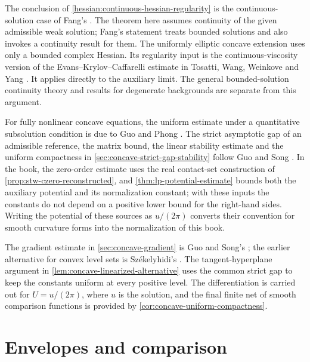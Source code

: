 The conclusion of \cref{hessian:continuous-hessian-regularity} is the
continuous-solution case of Fang's
\cite[v1, Theorem~4.1, pp.~17--18]{FangHessianSmooth26}.
The theorem here assumes continuity of the given admissible weak solution;
Fang's statement treats bounded solutions and also invokes a continuity
result for them. The uniformly elliptic concave extension uses only a
bounded complex Hessian. Its regularity input is the continuous-viscosity
version of the Evans--Krylov--Caffarelli estimate in Tosatti, Wang,
Weinkove and Yang
\cite[Theorem~3.4 and the paragraph following it, pp.~444--445]{TWWY15}.
It applies directly to the auxiliary limit. The general bounded-solution
continuity theory and results for degenerate backgrounds are separate
from this argument.

For fully nonlinear concave equations, the uniform estimate under a quantitative subsolution condition is due to Guo and Phong \cite[v1, Theorem~3.1 and its proof, pp.~8--11]{GP24}. The strict asymptotic gap of an admissible reference, the matrix bound, the linear stability estimate and the uniform compactness in \cref{sec:concave-strict-gap-stability} follow Guo and Song \cite[v1, Lemma~2.1, Proposition~2.8 and Lemma~2.9, pp.~4--11]{GS26}. In the book, the zero-order estimate uses the real contact-set construction of \cref{prop:stw-czero-reconstructed}, and \cref{thm:lp-potential-estimate} bounds both the auxiliary potential and its normalization constant; with these inputs the constants do not depend on a positive lower bound for the right-hand sides. Writing the potential of these sources as $u/(2\pi)$ converts their convention for smooth curvature forms into the normalization of this book.

The gradient estimate in \cref{sec:concave-gradient} is Guo and Song's \cite[v1, Theorem~1.1 and Proposition~3.1 with Lemmas~3.2--3.6, pp.~11--17]{GS26}; the earlier alternative for convex level sets is Sz{\'e}kelyhidi's \cite[Propositions~5--6, pp.~342--344]{Sze18}. The tangent-hyperplane argument in \cref{lem:concave-linearized-alternative} uses the common strict gap to keep the constants uniform at every positive level. The differentiation is carried out for $U=u/(2\pi)$, where $u$ is the solution, and the final finite net of smooth comparison functions is provided by \cref{cor:concave-uniform-compactness}.

\section{Envelopes and comparison}
\label{sec:history-envelopes}

